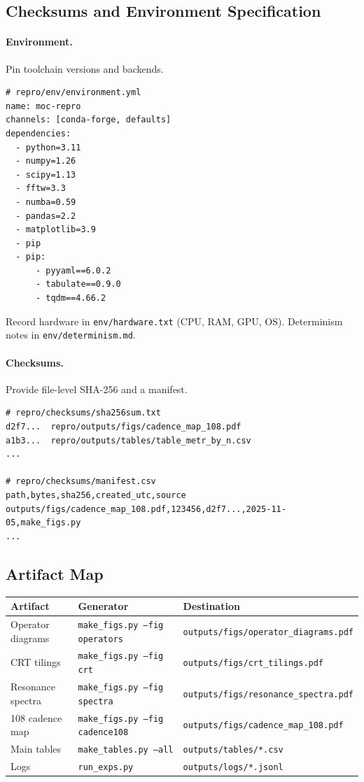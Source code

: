\documentclass[12pt]{article}
\numberwithin{equation}{section}
\theoremstyle{plain}
\theoremstyle{definition}
\theoremstyle{remark}
\begin{document}
\subsection*{Checksums and Environment Specification}
\paragraph{Environment.} Pin toolchain versions and backends.
\begin{verbatim}
# repro/env/environment.yml
name: moc-repro
channels: [conda-forge, defaults]
dependencies:
  - python=3.11
  - numpy=1.26
  - scipy=1.13
  - fftw=3.3
  - numba=0.59
  - pandas=2.2
  - matplotlib=3.9
  - pip
  - pip:
      - pyyaml==6.0.2
      - tabulate==0.9.0
      - tqdm==4.66.2
\end{verbatim}
Record hardware in \texttt{env/hardware.txt} (CPU, RAM, GPU, OS). Determinism notes in \texttt{env/determinism.md}.

\paragraph{Checksums.} Provide file-level SHA-256 and a manifest.
\begin{verbatim}
# repro/checksums/sha256sum.txt
d2f7...  repro/outputs/figs/cadence_map_108.pdf
a1b3...  repro/outputs/tables/table_metr_by_n.csv
...

# repro/checksums/manifest.csv
path,bytes,sha256,created_utc,source
outputs/figs/cadence_map_108.pdf,123456,d2f7...,2025-11-05,make_figs.py
...
\end{verbatim}

\subsection*{Artifact Map}
\begin{center}
\begin{tabular}{lll}
\toprule
Artifact & Generator & Destination \\
\midrule
Operator diagrams & \texttt{make\_figs.py --fig operators} & \texttt{outputs/figs/operator\_diagrams.pdf} \\
CRT tilings       & \texttt{make\_figs.py --fig crt}       & \texttt{outputs/figs/crt\_tilings.pdf} \\
Resonance spectra & \texttt{make\_figs.py --fig spectra}   & \texttt{outputs/figs/resonance\_spectra.pdf} \\
108 cadence map   & \texttt{make\_figs.py --fig cadence108}& \texttt{outputs/figs/cadence\_map\_108.pdf} \\
Main tables       & \texttt{make\_tables.py --all}         & \texttt{outputs/tables/*.csv} \\
Logs              & \texttt{run\_exps.py}                  & \texttt{outputs/logs/*.jsonl} \\
\bottomrule
\end{tabular}
\end{center}
\end{document}
